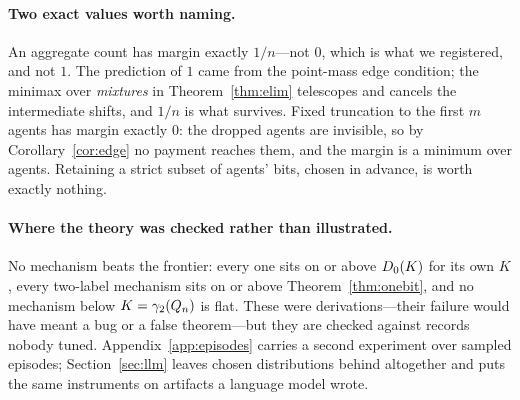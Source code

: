 \paragraph{Two exact values worth naming.}
An aggregate count has margin exactly $1/n$---not $0$, which is what we
registered, and not $1$. The prediction of $1$ came from the point-mass edge
condition; the minimax over \emph{mixtures} in Theorem~\ref{thm:elim} telescopes
and cancels the intermediate shifts, and $1/n$ is what survives. Fixed truncation
to the first $m$ agents has margin exactly $0$: the dropped agents are invisible,
so by Corollary~\ref{cor:edge} no payment reaches them, and the margin is a
minimum over agents. Retaining a strict subset of agents' bits, chosen in
advance, is worth exactly nothing.

\paragraph{Where the theory was checked rather than illustrated.}
No mechanism beats the frontier: every one sits on or above $D_0(K)$ for its
own $K$, every two-label mechanism sits on or above Theorem~\ref{thm:onebit}, and
no mechanism below $K = \gamma_2(Q_n)$ is flat. These were derivations---their
failure would have meant a bug or a false theorem---but they are checked against
records nobody tuned. Appendix~\ref{app:episodes} carries a second experiment
over sampled episodes; Section~\ref{sec:llm} leaves chosen distributions behind
altogether and puts the same instruments on artifacts a language model wrote.

